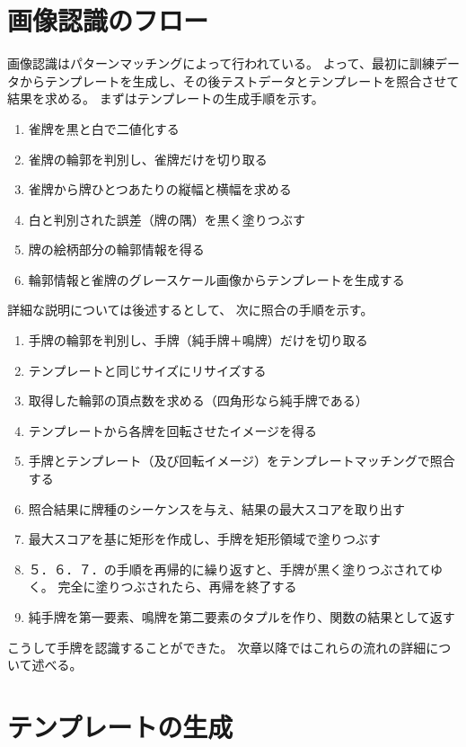 \documentclass{jsarticle}
\begin{document}
\begin{multicols}{2}
\section{画像認識のフロー}

画像認識はパターンマッチングによって行われている。
よって、最初に訓練データからテンプレートを生成し、その後テストデータとテンプレートを照合させて結果を求める。
まずはテンプレートの生成手順を示す。
\begin{enumerate}
\item 雀牌を黒と白で二値化する
\item 雀牌の輪郭を判別し、雀牌だけを切り取る
\item 雀牌から牌ひとつあたりの縦幅と横幅を求める
\item 白と判別された誤差（牌の隅）を黒く塗りつぶす
\item 牌の絵柄部分の輪郭情報を得る
\item 輪郭情報と雀牌のグレースケール画像からテンプレートを生成する
\end{enumerate}

詳細な説明については後述するとして、
次に照合の手順を示す。
\begin{enumerate}
\item 手牌の輪郭を判別し、手牌（純手牌＋鳴牌）だけを切り取る
\item テンプレートと同じサイズにリサイズする
\item 取得した輪郭の頂点数を求める（四角形なら純手牌である）
\item テンプレートから各牌を回転させたイメージを得る
\item 手牌とテンプレート（及び回転イメージ）をテンプレートマッチングで照合する
\item 照合結果に牌種のシーケンスを与え、結果の最大スコアを取り出す
\item 最大スコアを基に矩形を作成し、手牌を矩形領域で塗りつぶす
\item ５．６．７．の手順を再帰的に繰り返すと、手牌が黒く塗りつぶされてゆく。
		  完全に塗りつぶされたら、再帰を終了する
\item 純手牌を第一要素、鳴牌を第二要素のタプルを作り、関数の結果として返す
\end{enumerate}

こうして手牌を認識することができた。
次章以降ではこれらの流れの詳細について述べる。

\section{テンプレートの生成}


\end{multicols}
\end{document}
